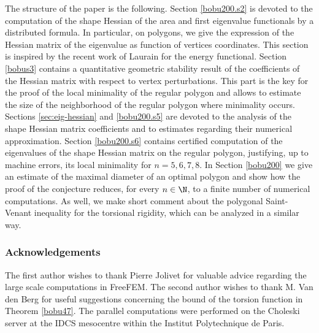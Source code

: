 \smallskip
The structure of the paper is the following. Section \ref{bobu200.s2}
is devoted to the computation of the shape Hessian of the area and first eigenvalue functionals by a distributed formula. In particular, on polygons, we give the expression of the Hessian matrix of the eigenvalue as function of vertices coordinates. This section is inspired by the recent work of Laurain \cite{laurain2ndDeriv} for the energy functional. Section \ref{bobus3} contains a quantitative geometric stability result of the coefficients of the Hessian matrix with respect to vertex perturbations. This part is the key for the proof of the local minimality of the regular polygon and allows to estimate the size of the neighborhood of the regular polygon where minimality occurs. Sections \ref{sec:eig-hessian} and \ref{bobu200.s5} are devoted to the analysis of the shape Hessian matrix coefficients and to estimates regarding their numerical approximation. Section \ref{bobu200.s6} contains certified computation of the eigenvalues of the shape Hessian matrix on the regular polygon, justifying, up to machine errors, its local minimality for $n= 5, 6, 7, 8$. In Section \ref{bobu200} we give an estimate of the maximal diameter of an optimal polygon and show how the proof of the conjecture reduces, for every $n \in \N$, to a finite number of numerical computations. As well, we make short comment about the polygonal Saint-Venant inequality for the torsional rigidity, which can be analyzed in a similar way.

\subsubsection*{Acknowledgements}
The first author wishes to thank Pierre Jolivet for valuable advice regarding the large scale computations in FreeFEM. The second author wishes to thank M. Van den Berg for useful suggestions concerning the bound of the torsion function in Theorem \ref{bobu47}. The parallel computations were performed on the Choleski server at the IDCS mesocentre within the Institut Polytechnique de Paris.

